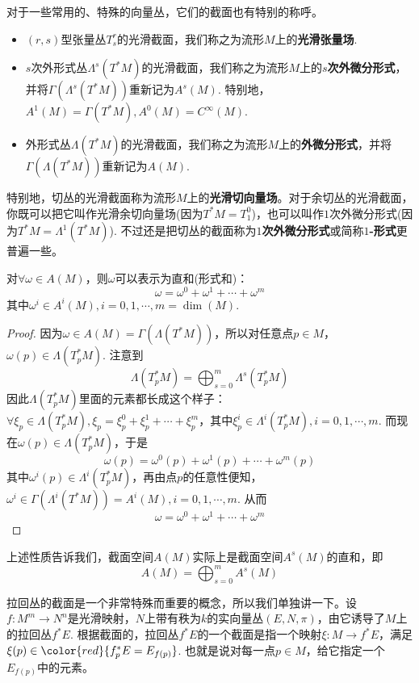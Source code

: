 对于一些常用的、特殊的向量丛，它们的截面也有特别的称呼。
\begin{itemize}
\item $(r,s)$型张量丛$T^{r}_{s}$的光滑截面，我们称之为流形$M$上的\textbf{光滑张量场}.
\item $s$次外形式丛$\Lambda^{s}(T^{\ast}M)$的光滑截面，我们称之为流形$M$上的\textbf{$s$次外微分形式}，并将$\Gamma(\Lambda^{s}(T^{\ast}M))$重新记为$A^{s}(M)$. 特别地，$A^{1}(M)=\Gamma(T^{\ast}M),A^{0}(M)=C^{\infty}(M)$.
\item 外形式丛$\Lambda(T^{\ast}M)$的光滑截面，我们称之为流形$M$上的\textbf{外微分形式}，并将$\Gamma(\Lambda(T^{\ast}M))$重新记为$A(M)$.
\end{itemize}
特别地，切丛的光滑截面称为流形$M$上的\textbf{光滑切向量场}。对于余切丛的光滑截面，你既可以把它叫作光滑余切向量场(因为$T^{\ast}M=T^{0}_{1}$)，也可以叫作$1$次外微分形式(因为$T^{\ast}M=\Lambda^{1}(T^{\ast}M)$). 不过还是把切丛的截面称为\textbf{$1$次外微分形式}或简称\textbf{$1$-形式}更普遍一些。

\begin{myprop}{}{}
对$\forall \omega\in A(M)$，则$\omega$可以表示为直和(形式和)：
\[
\omega=\omega^{0}+\omega^{1}+\cdots+\omega^{m}
\]
其中$\omega^{i}\in A^{i}(M),i=0,1,\cdots,m=\operatorname{dim}(M)$.
\end{myprop}
\begin{proof}
因为$\omega\in A(M)=\Gamma(\Lambda(T^{\ast}M))$，所以对任意点$p\in M$，$\omega(p)\in \Lambda(T^{\ast}_{p}M)$. 注意到
\[
	\Lambda(T^{\ast}_{p}M)=\bigoplus_{s=0}^{m}\Lambda^{s}(T^{\ast}_{p}M)
\]
因此$\Lambda(T^{\ast}_{p}M)$里面的元素都长成这个样子：$\forall \xi_{p}\in \Lambda(T^{\ast}_{p}M),\xi_{p}=\xi^{0}_{p}+\xi^{1}_{p}+\cdots +\xi^{m}_{p}$，其中$\xi^{i}_{p}\in \Lambda^{i}(T^{\ast}_{p}M),i=0,1,\cdots,m$. 而现在$\omega(p)\in \Lambda(T^{\ast}_{p}M)$，于是
\[
	\omega(p)=\omega^{0}(p)+\omega^{1}(p)+\cdots+\omega^{m}(p)
\]
其中$\omega^{i}(p)\in \Lambda^{i}(T^{\ast}_{p}M)$，再由点$p$的任意性便知，$\omega^{i}\in \Gamma(\Lambda^{i}(T^{\ast}M))=A^{i}(M),i=0,1,\cdots,m$. 从而
\[
	\omega=\omega^{0}+\omega^{1}+\cdots+\omega^{m}
\]
\end{proof}

上述性质告诉我们，截面空间$A(M)$实际上是截面空间$A^{s}(M)$的直和，即
\[
A(M)=\bigoplus_{s=0}^{m}A^{s}(M)
\]

拉回丛的截面是一个非常特殊而重要的概念，所以我们单独讲一下。设$f:M^{m}\longrightarrow N^{n}$是光滑映射，$N$上带有秩为$k$的实向量丛$(E,N,\pi)$，由它诱导了$M$上的拉回丛$f^{\ast}E$. 根据截面的，拉回丛$f^{\ast}E$的一个截面是指一个映射$\xi:M\longrightarrow f^{\ast}E$，满足$\xi(p)\in {\color{red}{f^{\ast}_{p}E=E_{f(p)}}}$. 也就是说对每一点$p\in M$，给它指定一个$E_{f(p)}$中的元素。

